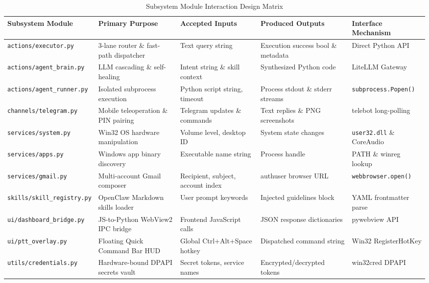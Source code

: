\documentclass[12pt,letterpaper,oneside]{report}
\begin{document}
\begin{table}[H]
\centering
\caption{Subsystem Module Interaction Design Matrix}
\label{tab:module_interaction}
\begin{tabularx}{\textwidth}{|l|l|X|X|l|}
\hline
\textbf{Subsystem Module} & \textbf{Primary Purpose} & \textbf{Accepted Inputs} & \textbf{Produced Outputs} & \textbf{Interface Mechanism}\\ \hline
\texttt{actions/executor.py} & 3-lane router \& fast-path dispatcher & Text query string & Execution success bool \& metadata & Direct Python API\\ \hline
\texttt{actions/agent\_brain.py} & LLM cascading \& self-healing & Intent string \& skill context & Synthesized Python code & LiteLLM Gateway\\ \hline
\texttt{actions/agent\_runner.py} & Isolated subprocess execution & Python script string, timeout & Process stdout \& stderr streams & \texttt{subprocess.Popen()}\\ \hline
\texttt{channels/telegram.py} & Mobile teleoperation \& PIN pairing & Telegram updates \& commands & Text replies \& PNG screenshots & telebot long-polling\\ \hline
\texttt{services/system.py} & Win32 OS hardware manipulation & Volume level, desktop ID & System state changes & \texttt{user32.dll} \& CoreAudio\\ \hline
\texttt{services/apps.py} & Windows app binary discovery & Executable name string & Process handle & PATH \& winreg lookup\\ \hline
\texttt{services/gmail.py} & Multi-account Gmail composer & Recipient, subject, account index & authuser browser URL & \texttt{webbrowser.open()}\\ \hline
\texttt{skills/skill\_registry.py} & OpenClaw Markdown skills loader & User prompt keywords & Injected guidelines block & YAML frontmatter parse\\ \hline
\texttt{ui/dashboard\_bridge.py} & JS-to-Python WebView2 IPC bridge & Frontend JavaScript calls & JSON response dictionaries & pywebview API\\ \hline
\texttt{ui/ptt\_overlay.py} & Floating Quick Command Bar HUD & Global Ctrl+Alt+Space hotkey & Dispatched command string & Win32 RegisterHotKey\\ \hline
\texttt{utils/credentials.py} & Hardware-bound DPAPI secrets vault & Secret tokens, service names & Encrypted/decrypted tokens & win32cred DPAPI\\ \hline
\end{tabularx}
\end{table}
\end{document}
